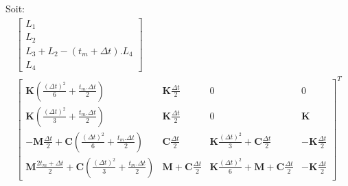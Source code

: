 \documentclass[12pt,a4paper]{report}
\begin{document}
Soit:
\begin{equation}
\begin{array}{c}
	\begin{bmatrix}	
		  L_1
		\\L_2
		\\ L_3 + L_2 - (t_m+\Delta t).L_4
		\\L_4
	\end{bmatrix}
	\\
		\begin{bmatrix}	   
			   \mathbf{K}
				   \left( \frac{(\Delta t)^2}{6} + \frac{t_m.\Delta t}{2}
				   \right)
			&
		   		\mathbf{K} \frac{\Delta t}{2}
		   	&   
		   		0
			&
		   		0
		\\   
			   \mathbf{K}
				   \left( \frac{(\Delta t)^2}{3} + \frac{t_m.\Delta t}{2}
				   \right)
			&
		   		\mathbf{K} \frac{\Delta t}{2} 
		   	&
		   		0
			&
		   		\mathbf{K}
		\\   
			   -\mathbf{M}
			   		\frac{\Delta t}{2} 
			   +\mathbf{C}
			   		\left( \frac{(\Delta t)^2}{6} 
			   				+ \frac{t_m.\Delta t}{2} \right)  
		   	& 
		   		\mathbf{C} \frac{\Delta t}{2}
		   	&
			   	\mathbf{K}
			   		\frac{(\Delta t)^2}{3} 
		   		+\mathbf{C} \frac{\Delta t}{2}
		   	&
		   		-\mathbf{K} \frac{\Delta t}{2}
		\\   
			   \mathbf{M}
			   		\frac{2t_m + \Delta t}{2} 
			   +\mathbf{C}
			   		\left( \frac{(\Delta t)^2}{3} 
			   				+ \frac{t_m.\Delta t}{2}\right)
		   	&
			   \mathbf{M} 
			   +\mathbf{C} \frac{\Delta t}{2}
		   	&
		   		\mathbf{K} \frac{(\Delta t)^2}{6} 
		   		+\mathbf{M} 
			   	+\mathbf{C} \frac{\Delta t}{2}
		   	&
		   		-\mathbf{K} \frac{\Delta t}{2}
	\end{bmatrix}^T
\end{array}
\end{equation}
\end{document}
